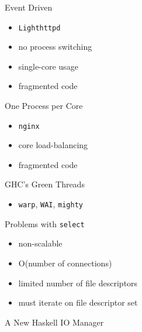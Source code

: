 \documentclass{beamer}
\begin{document}
\begin{frame}{Event Driven}
  \begin{center}\end{center}
  \begin{itemize}
    \item \texttt{Lighthttpd}
    \pause
    \item no process switching
    \pause
    \item single-core usage
    \item fragmented code
  \end{itemize}
\end{frame}

\begin{frame}{One Process per Core}
  \begin{center}\end{center}
  \begin{itemize}
    \item \texttt{nginx}
    \pause
    \item core load-balancing
    \pause
    \item fragmented code
  \end{itemize}
\end{frame}

\begin{frame}{GHC's Green Threads}
  \begin{center}\end{center}
  \begin{itemize}
    \item \texttt{warp}, \texttt{WAI}, \texttt{mighty}
  \end{itemize}
\end{frame}

\begin{frame}{Problems with \texttt{select}}
  \begin{itemize}[<+->]
    \item non-scalable
    \item O(number of connections)
    \item limited number of file descriptors
    \item must iterate on file descriptor set
  \end{itemize}
\end{frame}

\begin{frame}{A New Haskell IO Manager}
  \centering
\end{frame}
\end{document}
